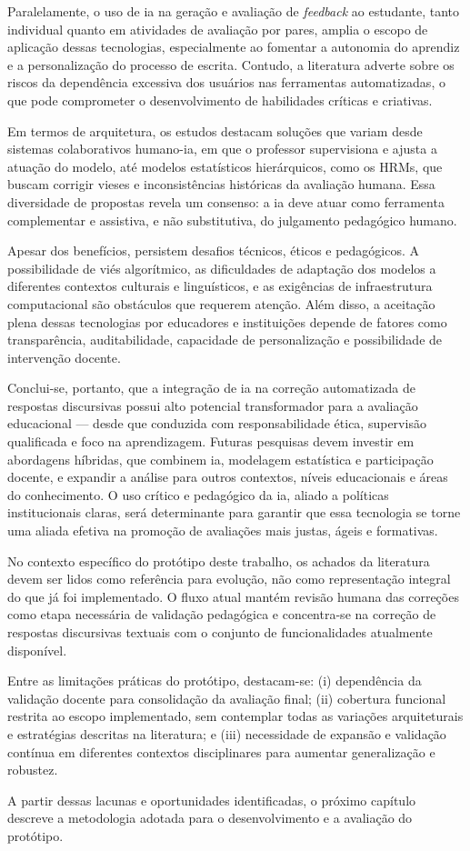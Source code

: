 Paralelamente, o uso de \gls{ia} na geração e avaliação de \textit{feedback} ao estudante, tanto individual quanto em atividades de avaliação por pares, amplia o escopo de aplicação dessas tecnologias, especialmente ao fomentar a autonomia do aprendiz e a personalização do processo de escrita. Contudo, a literatura adverte sobre os riscos da dependência excessiva dos usuários nas ferramentas automatizadas, o que pode comprometer o desenvolvimento de habilidades críticas e criativas.

Em termos de arquitetura, os estudos destacam soluções que variam desde sistemas colaborativos humano-\gls{ia}, em que o professor supervisiona e ajusta a atuação do modelo, até modelos estatísticos hierárquicos, como os HRMs, que buscam corrigir vieses e inconsistências históricas da avaliação humana. Essa diversidade de propostas revela um consenso: a \gls{ia} deve atuar como ferramenta complementar e assistiva, e não substitutiva, do julgamento pedagógico humano.

Apesar dos benefícios, persistem desafios técnicos, éticos e pedagógicos. A possibilidade de viés algorítmico, as dificuldades de adaptação dos modelos a diferentes contextos culturais e linguísticos, e as exigências de infraestrutura computacional são obstáculos que requerem atenção. Além disso, a aceitação plena dessas tecnologias por educadores e instituições depende de fatores como transparência, auditabilidade, capacidade de personalização e possibilidade de intervenção docente.

Conclui-se, portanto, que a integração de \gls{ia} na correção automatizada de respostas discursivas possui alto potencial transformador para a avaliação educacional — desde que conduzida com responsabilidade ética, supervisão qualificada e foco na aprendizagem. Futuras pesquisas devem investir em abordagens híbridas, que combinem \gls{ia}, modelagem estatística e participação docente, e expandir a análise para outros contextos, níveis educacionais e áreas do conhecimento. O uso crítico e pedagógico da \gls{ia}, aliado a políticas institucionais claras, será determinante para garantir que essa tecnologia se torne uma aliada efetiva na promoção de avaliações mais justas, ágeis e formativas.

No contexto específico do protótipo deste trabalho, os achados da literatura devem ser lidos como referência para evolução, não como representação integral do que já foi implementado. O fluxo atual mantém revisão humana das correções como etapa necessária de validação pedagógica e concentra-se na correção de respostas discursivas textuais com o conjunto de funcionalidades atualmente disponível.

Entre as limitações práticas do protótipo, destacam-se: (i) dependência da validação docente para consolidação da avaliação final; (ii) cobertura funcional restrita ao escopo implementado, sem contemplar todas as variações arquiteturais e estratégias descritas na literatura; e (iii) necessidade de expansão e validação contínua em diferentes contextos disciplinares para aumentar generalização e robustez.

A partir dessas lacunas e oportunidades identificadas, o próximo capítulo descreve a metodologia adotada para o desenvolvimento e a avaliação do protótipo.
